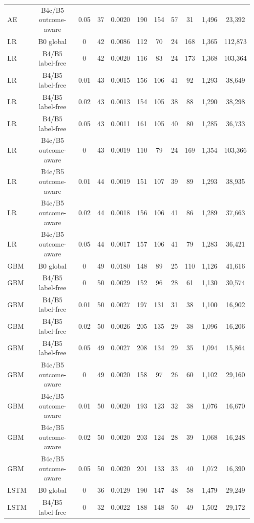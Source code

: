\documentclass[10pt,onecolumn,letterpaper]{article}
\begin{document}
\begin{table}[!t]
{\begin{tabular}{lcccccccccc}
AE & B4c/B5 outcome-aware & 0.05 & 37 & 0.0020 & 190 & 154 & 57 & 31 & 1,496 & 23,392 \\
LR & B0 global & 0 & 42 & 0.0086 & 112 & 70 & 24 & 168 & 1,365 & 112,873 \\
LR & B4/B5 label-free & 0 & 42 & 0.0020 & 116 & 83 & 24 & 173 & 1,368 & 103,364 \\
LR & B4/B5 label-free & 0.01 & 43 & 0.0015 & 156 & 106 & 41 & 92 & 1,293 & 38,649 \\
LR & B4/B5 label-free & 0.02 & 43 & 0.0013 & 154 & 105 & 38 & 88 & 1,290 & 38,298 \\
LR & B4/B5 label-free & 0.05 & 43 & 0.0011 & 161 & 105 & 40 & 80 & 1,285 & 36,733 \\
LR & B4c/B5 outcome-aware & 0 & 43 & 0.0019 & 110 & 79 & 24 & 169 & 1,354 & 103,366 \\
LR & B4c/B5 outcome-aware & 0.01 & 44 & 0.0019 & 151 & 107 & 39 & 89 & 1,293 & 38,935 \\
LR & B4c/B5 outcome-aware & 0.02 & 44 & 0.0018 & 156 & 106 & 41 & 86 & 1,289 & 37,663 \\
LR & B4c/B5 outcome-aware & 0.05 & 44 & 0.0017 & 157 & 106 & 41 & 79 & 1,283 & 36,421 \\
GBM & B0 global & 0 & 49 & 0.0180 & 148 & 89 & 25 & 110 & 1,126 & 41,616 \\
GBM & B4/B5 label-free & 0 & 50 & 0.0029 & 152 & 96 & 28 & 61 & 1,130 & 30,574 \\
GBM & B4/B5 label-free & 0.01 & 50 & 0.0027 & 197 & 131 & 31 & 38 & 1,100 & 16,902 \\
GBM & B4/B5 label-free & 0.02 & 50 & 0.0026 & 205 & 135 & 29 & 38 & 1,096 & 16,206 \\
GBM & B4/B5 label-free & 0.05 & 49 & 0.0027 & 208 & 134 & 29 & 35 & 1,094 & 15,864 \\
GBM & B4c/B5 outcome-aware & 0 & 49 & 0.0020 & 158 & 97 & 26 & 60 & 1,102 & 29,160 \\
GBM & B4c/B5 outcome-aware & 0.01 & 50 & 0.0020 & 193 & 123 & 32 & 38 & 1,076 & 16,670 \\
GBM & B4c/B5 outcome-aware & 0.02 & 50 & 0.0020 & 203 & 124 & 28 & 39 & 1,068 & 16,248 \\
GBM & B4c/B5 outcome-aware & 0.05 & 50 & 0.0020 & 201 & 133 & 33 & 40 & 1,072 & 16,390 \\
LSTM & B0 global & 0 & 36 & 0.0129 & 190 & 147 & 48 & 58 & 1,479 & 29,249 \\
LSTM & B4/B5 label-free & 0 & 32 & 0.0022 & 188 & 148 & 50 & 49 & 1,502 & 29,172 \\

\end{tabular}}
\end{table}
\end{document}
